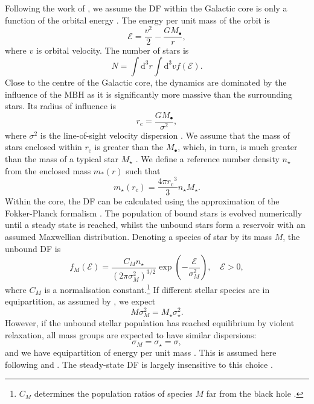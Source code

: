 \documentclass[useAMS,usedcolumn,usegraphicx,usenatbib]{mn2e}
\newcommand{\sub}[1]{\ensuremath{_\mathrm{#1}}}
\newcommand{\dd}{\ensuremath{\mathrm{d}}}
\begin{document}
Following the work of \citet{Bahcall1976, Bahcall1977}, we assume the DF within the Galactic core is only a function of the orbital energy \citep{Shapiro1978}. The energy per unit mass of the orbit is
\begin{equation}
\mathcal{E} = \frac{v^2}{2} - \frac{GM_\bullet}{r},
\end{equation}
where $v$ is orbital velocity. The number of stars is
\begin{equation}
N = \int \dd^3r \int \dd^3v f(\mathcal{E}).
\end{equation}
Close to the centre of the Galactic core, the dynamics are dominated by the influence of the MBH as it is significantly more massive than the surrounding stars. Its radius of influence is
\begin{equation}
r\sub{c} = \frac{GM_\bullet}{\sigma^2},
\label{eq:r_c}
\end{equation}
where $\sigma^2$ is the line-of-sight velocity dispersion \citep{Frank1976}. We assume that the mass of stars enclosed within $r\sub{c}$ is greater than the $M_\bullet$, which, in turn, is much greater than the mass of a typical star $M_\star$ \citep{Bahcall1976}. We define a reference number density $n_\star$ from the enclosed mass $m_\ast(r)$ such that
\begin{equation}
m_\star(r\sub{c}) = \frac{4\pi r\sub{c}^3}{3}n_\star M_\star.
\end{equation}
Within the core, the DF can be calculated using the approximation of the Fokker-Planck formalism \citep[section 7.4]{Binney2008}. The population of bound stars is evolved numerically until a steady state is reached, whilst the unbound stars form a reservoir with an assumed Maxwellian distribution. Denoting a species of star by its mass $M$, the unbound DF is
\begin{equation}
f_M(\mathcal{E}) = \frac{C_M n_\star}{(2\pi\sigma_M^2)^{3/2}} \exp\left(-\frac{\mathcal{E}}{\sigma_M^2}\right),\quad\mathcal{E} > 0,
\label{eq:Unbound_DF}
\end{equation}
where $C_M$ is a normalisation constant.\footnote{$C_M$ determines the population ratios of species $M$ far from the black hole \citep{Alexander2009}.} If different stellar species are in equipartition, as assumed by \citet{Bahcall1976, Bahcall1977}, we expect
\begin{equation}
M \sigma_M^2 = M_\star \sigma_\star^2.
\end{equation}
However, if the unbound stellar population has reached equilibrium by violent relaxation, all mass groups are expected to have similar dispersions:
\begin{equation}
\sigma_M = \sigma_\star = \sigma,
\end{equation}
and we have equipartition of energy per unit mass \citep{Lynden-Bell1967}. This is assumed here following \citet{Alexander2009} and \citet{O'Leary2009}. The steady-state DF is largely insensitive to this choice \citep{Bahcall1977, Alexander2009}.
\end{document}
